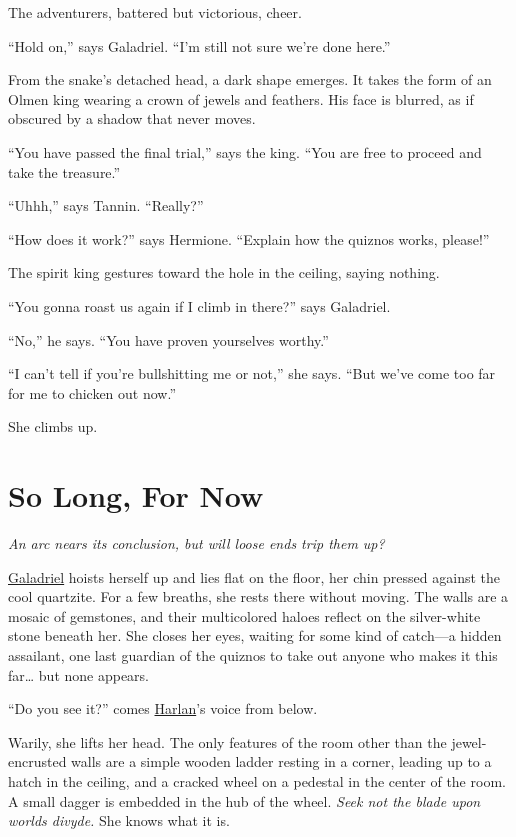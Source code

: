\documentclass[smalldemyvopaper,11pt,twoside,onecolumn,openright,extrafontsizes]{memoir}
\newcommand{\chapdesc}[1]{
    \begin{flushright}
    \emph{{#1}}
    \end{flushright}
    \vspace{26pt}
}
\begin{document}
The adventurers, battered but victorious, cheer.

``Hold on,'' says Galadriel. ``I'm still not sure we're done here.''

From the snake's detached head, a dark shape emerges. It takes the form
of an Olmen king wearing a crown of jewels and feathers. His face is
blurred, as if obscured by a shadow that never moves.

``You have passed the final trial,'' says the king. ``You are free to
proceed and take the treasure.''

``Uhhh,'' says Tannin. ``Really?''

``How does it work?'' says Hermione. ``Explain how the quiznos works,
please!''

The spirit king gestures toward the hole in the ceiling, saying nothing.

``You gonna roast us again if I climb in there?'' says Galadriel.

``No,'' he says. ``You have proven yourselves worthy.''

``I can't tell if you're bullshitting me or not,'' she says. ``But we've
come too far for me to chicken out now.''

She climbs up.


\chapter{So Long, For Now}
\chapdesc{An arc nears its conclusion, but will loose ends trip them up?}

\href{/characters/galadriel/}{Galadriel} hoists herself up and lies flat
on the floor, her chin pressed against the cool quartzite. For a few
breaths, she rests there without moving. The walls are a mosaic of
gemstones, and their multicolored haloes reflect on the silver-white
stone beneath her. She closes her eyes, waiting for some kind of
catch---a hidden assailant, one last guardian of the quiznos to take out
anyone who makes it this far\ldots{} but none appears.

``Do you see it?'' comes \href{/characters/harlan/}{Harlan}'s voice from
below.

Warily, she lifts her head. The only features of the room other than the
jewel-encrusted walls are a simple wooden ladder resting in a corner,
leading up to a hatch in the ceiling, and a cracked wheel on a pedestal
in the center of the room. A small dagger is embedded in the hub of the
wheel. \emph{Seek not the blade upon worlds divyde.} She knows what it
is.
\end{document}
